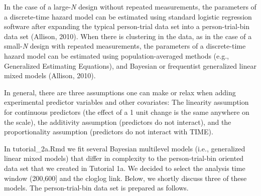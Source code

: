 \documentclass[
  man, donotrepeattitle,floatsintext]{apa6}
\begin{document}
In the case of a large-\emph{N} design without repeated measurements, the parameters of a discrete-time hazard model can be estimated using standard logistic regression software after expanding the typical person-trial data set into a person-trial-bin data set (Allison, 2010). When there is clustering in the data, as in the case of a small-\emph{N} design with repeated measurements, the parameters of a discrete-time hazard model can be estimated using population-averaged methods (e.g., Generalized Estimating Equations), and Bayesian or frequentist generalized linear mixed models (Allison, 2010).

In general, there are three assumptions one can make or relax when adding experimental predictor variables and other covariates: The linearity assumption for continuous predictors (the effect of a 1 unit change is the same anywhere on the scale), the additivity assumption (predictors do not interact), and the proportionality assumption (predictors do not interact with TIME).

In tutorial\_2a.Rmd we fit several Bayesian multilevel models (i.e., generalized linear mixed models) that differ in complexity to the person-trial-bin oriented data set that we created in Tutorial 1a. We decided to select the analysis time window (200,600{]} and the cloglog link. Below, we shortly discuss three of these models. The person-trial-bin data set is prepared as follows.

\footnotesize
\end{document}

